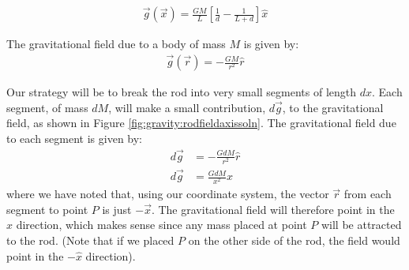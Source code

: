 \begin{finalanswer}
\begin{align*}
\vec g(\vec x)=\frac{GM}{L}\left[\frac{1}{d}-\frac{1}{L+d}\right]\hat{x}
\end{align*}
\end{finalanswer}
\begin{solution}
The gravitational field due to a body of mass $M$ is given by:
\begin{align*}
\vec g(\vec r)=-\frac{GM}{r^2}\hat{r}
\end{align*}

Our strategy will be to break the rod into very small segments of length $dx$. Each segment, of mass $dM$, will make a small contribution, $d\vec g$, to the gravitational field, as shown in Figure \ref{fig:gravity:rodfieldaxissoln}. The gravitational field due to each segment is given by:
\begin{align*}
d\vec g&=-\frac{GdM}{r^2}\hat{r}\\
d\vec g&=\frac{GdM}{x^2}\hat{x}
\end{align*}
where we have noted that, using our coordinate system, the vector $\vec r$ from each segment to point $P$ is just $-\vec x$. The gravitational field will therefore point in the $\hat{x}$ direction, which makes sense since any mass placed at point $P$ will be attracted to the rod. (Note that if we placed $P$ on the other side of the rod, the field would point in the $-\hat{x}$ direction).\\


\end{solution}
